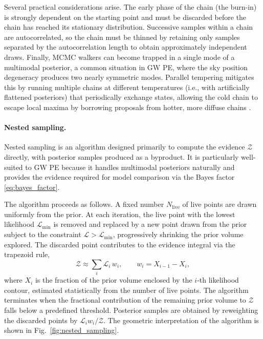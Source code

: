 Several practical considerations arise. The early phase of the chain (the burn-in) is strongly dependent on the starting point and must be discarded before the chain has reached its stationary distribution. Successive samples within a chain are autocorrelated, so the chain must be thinned by retaining only samples separated by the autocorrelation length to obtain approximately independent draws. Finally, MCMC walkers can become trapped in a single mode of a multimodal posterior, a common situation in GW PE, where the sky position degeneracy produces two nearly symmetric modes. Parallel tempering mitigates 
this by running multiple chains at different temperatures 
(i.e., with artificially flattened posteriors) that periodically exchange states, allowing the cold chain to escape local maxima by borrowing proposals from hotter, more diffuse chains \cite{likelihood_formula}.

\paragraph{Nested sampling.}
\label{nested_sampling}

Nested sampling is an algorithm designed primarily to compute the evidence $\mathcal{Z}$ directly, with posterior samples produced as a byproduct. It is particularly well-suited to GW PE because it handles multimodal posteriors naturally and provides the evidence required for model comparison via the Bayes factor \eqref{eq:bayes_factor}. 

The algorithm proceeds as follows. A fixed number $N_\text{live}$ of live points are drawn uniformly from the prior. At each iteration, the live point with the lowest likelihood $\mathcal{L}_\mathrm{min}$ is removed and replaced by a new point drawn from the prior subject to the constraint $\mathcal{L} > \mathcal{L}_\mathrm{min}$, progressively shrinking the prior volume explored. The discarded point contributes to the evidence integral via the trapezoid rule,
\begin{equation}
    \mathcal{Z} \approx \sum_i \mathcal{L}_i\, w_i,
    \qquad
    w_i = X_{i-1} - X_i,
\end{equation}
where $X_i$ is the fraction of the prior volume enclosed by the $i$-th likelihood contour, estimated statistically from the number of live points. The algorithm terminates when the fractional contribution of the remaining prior volume to $\mathcal{Z}$ falls below a predefined threshold. Posterior samples are obtained by reweighting the discarded points by $\mathcal{L}_i w_i / \mathcal{Z}$. The geometric interpretation of the algorithm is shown in Fig.~\ref{fig:nested_sampling}.

